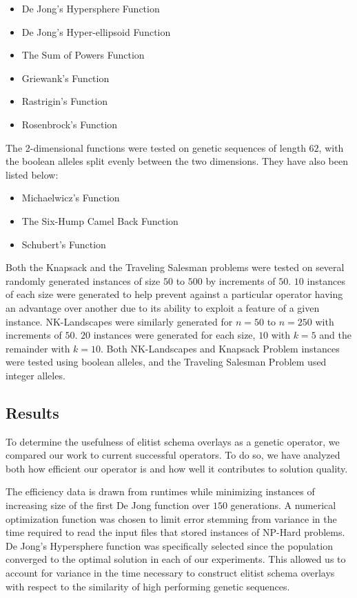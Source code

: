 \begin{itemize}
\item De Jong's Hypersphere Function
\item De Jong's Hyper-ellipsoid Function
\item The Sum of Powers Function
\item Griewank's Function
\item Rastrigin's Function
\item Rosenbrock's Function
\end{itemize} 

The 2-dimensional functions were tested on genetic sequences of length $62$, with the boolean alleles split evenly between the two dimensions. They have also been listed below:

\begin{itemize}
\item Michaelwicz's Function
\item The Six-Hump Camel Back Function
\item Schubert's Function
\end{itemize}

Both the Knapsack and the Traveling Salesman problems were tested on several randomly generated instances of size $50$ to $500$ by increments of $50$. $10$ instances of each size were generated to help prevent against a particular operator having an advantage over another due to its ability to exploit a feature of a given instance. NK-Landscapes were similarly generated for $n = 50$ to $n = 250$ with increments of $50$. $20$ instances were generated for each size, $10$ with $k = 5$ and the remainder with $k = 10$. Both NK-Landscapes and Knapsack Problem instances were tested using boolean alleles, and the Traveling Salesman Problem used integer alleles.

\subsection*{Results}
To determine the usefulness of elitist schema overlays as a genetic operator, we compared our work to current successful operators. To do so, we have analyzed both how efficient our operator is and how well it contributes to solution quality. 

The efficiency data is drawn from runtimes while minimizing instances of increasing size of the first De Jong function over $150$ generations. A numerical optimization function was chosen to limit error stemming from variance in the time required to read the input files that stored instances of NP-Hard problems. De Jong's Hypersphere function was specifically selected since the population converged to the optimal solution in each of our experiments. This allowed us to account for variance in the time necessary to construct elitist schema overlays with respect to the similarity of high performing genetic sequences.

